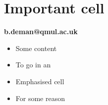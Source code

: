\vspace{-0.8cm}

{\color{emphasisered} \section{Important cell}}

\vspace{-0.8cm}
\huge
\centering
\textbf{b.deman@qmul.ac.uk}

\normalsize

\begin{itemize}%
	\item Some content
	\item To go in an
	\item Emphasised cell
	\item For some reason
\end{itemize}
\vspace{-1.6cm}

